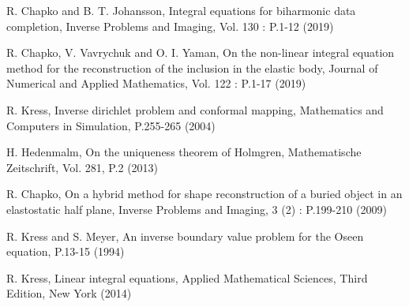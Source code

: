 \documentclass[12pt]{report}
\begin{document}
\begin{thebibliography}{99}

R. Chapko and B. T. Johansson, Integral equations for biharmonic data completion, Inverse Problems and Imaging, Vol. 130 : P.1-12 (2019)
 
 R. Chapko, V. Vavrychuk and O. I. Yaman, On the non-linear integral equation method for the reconstruction of the inclusion in the elastic body, Journal of Numerical and Applied Mathematics, Vol. 122 : P.1-17 (2019)
 
R. Kress, Inverse dirichlet problem and conformal mapping, Mathematics and Computers in Simulation, P.255-265 (2004)
 
H. Hedenmalm, On the uniqueness theorem of Holmgren, Mathematische Zeitschrift, Vol. 281, P.2 (2013)

R. Chapko, On a hybrid method for shape reconstruction of a buried object in an elastostatic half plane, Inverse Problems and Imaging, 3 (2) : P.199-210 (2009)

R. Kress and S. Meyer, An inverse boundary value problem for the Oseen equation, P.13-15 (1994)
 
R. Kress, Linear integral equations, Applied Mathematical Sciences, Third Edition, New York (2014) 

\end{thebibliography}
\end{document}
